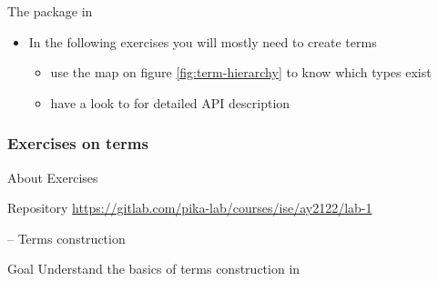 \documentclass[presentation]{beamer}\mode<presentation>{\usetheme{AMSBolognaFC}}
\begin{document}
\begin{frame}[allowframebreaks]{The  package in }
\begin{itemize}
        \bigskip

        \item In the following exercises you will mostly need to create terms
        \begin{itemize}
            \item use the map on figure \ref{fig:term-hierarchy} to know \alert{which} types exist
            \item have a look to \cite{Ciatto20212pktPresentation} for detailed API description
        \end{itemize}
    \end{itemize}
\end{frame}

\subsubsection{Exercises on terms}

\begin{frame}{About Exercises}

    \begin{block}{Repository}
        \centering
        \url{https://gitlab.com/pika-lab/courses/ise/ay2122/lab-1}
    \end{block}
    
\end{frame}

\startExercise{}

\begin{frame}{\currentExercise{} -- Terms construction}
    \label{slide:first-exercise-on-terms}

    \begin{block}{Goal}
        Understand the basics of terms construction in \twopkt{}
    \end{block}
    
\end{frame}

\startExercise{}
\end{document}
